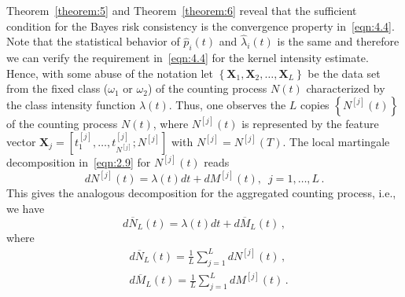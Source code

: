 \documentclass[lettersize,journal,onecolumn]{IEEEtran}
\theoremstyle{definition}
\begin{document}
Theorem~\ref{theorem:5} and Theorem~\ref{theorem:6} reveal that the sufficient
condition for the Bayes risk consistency is the convergence property 
in~\eqref{eqn:4.4}. Note that the statistical behavior of
$\widehat{p}_{i}(t)$ and $\widehat{\lambda}_{i}(t)$ is the same and therefore we can 
verify the requirement in~\eqref{eqn:4.4} for the
kernel intensity estimate. Hence, with some abuse of the notation let \mbox{$
	\left\{ \mathbf{X}_{1},	\mathbf{X}_{2}, \ldots, \mathbf{X}_{L} \right\}
	$} be the data set from the fixed class ($\omega_{1}$ or $\omega_{2}$)
of the counting process $N(t)$ characterized by 
the class intensity function $\lambda(t)$. Thus, one observes the $L$ copies 
$\left\{N^{[j]}(t)\right\}$ of the counting
process $N(t)$, where $N^{[j]}(t)$ is represented by the feature vector \mbox{$
	\mathbf{X}_{j} = \left[
	t_{1}^{[j]}, \ldots, t_{N^{[j]}}^{[j]}; N^{[j]}
	\right]
	$} with $N^{[j]}=N^{[j]}(T)$. The local martingale decomposition in~\eqref{eqn:2.9} for 
$N^{[j]}(t)$ reads
\begin{equation*}
	dN^{[j]}(t) = 
	\lambda(t)dt + dM^{[j]}(t),
	\enspace j=1,\ldots,L
	\,.
\end{equation*}
This gives the analogous decomposition for the aggregated counting process, i.e., we
have
\begin{equation}
	d\overline{N}_{L}(t) = \lambda(t)dt + d\overline{M}_{L}(t)
	\label{eqn:4.11}\,,
\end{equation}
where 
\begin{equation*}
	\begin{split}
		& d\overline{N}_{L}(t) = \frac{1}{L}	\sum_{j=1}^{L} dN^{[j]}(t) \,,\\
		& d\overline{M}_{L}(t) = \frac{1}{L}	\sum_{j=1}^{L} dM^{[j]}(t) \,.
	\end{split}
\end{equation*}
\end{document}
